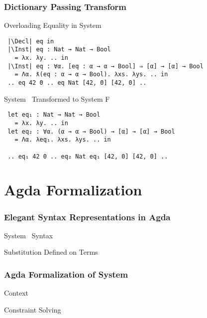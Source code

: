 \documentclass{beamer}
\begin{document}
\begin{frame}[fragile]
  \frametitle{Dictionary Passing Transform}
  \begin{block}{Overloading Equality in System \Fo\ }
    \begin{center}
      \begin{verbatim}
 |\Decl| eq in
 |\Inst| eq : Nat → Nat → Bool 
   = λx. λy. .. in
 |\Inst| eq : ∀α. [eq : α → α → Bool] ⇒ [α] → [α] → Bool 
   = Λα. ƛ(eq : α → α → Bool). λxs. λys. .. in
 .. eq 42 0 .. eq Nat [42, 0] [42, 0] .. 
      \end{verbatim}
    \end{center}
  \end{block}
  \begin{block}{System \Fo\ Transformed to System F}
    \begin{center}
      \begin{verbatim}
 let eq₁ : Nat → Nat → Bool 
   = λx. λy. .. in
 let eq₂ : ∀α. (α → α → Bool) → [α] → [α] → Bool 
   = Λα. λeq₁. λxs. λys. .. in
  
 .. eq₁ 42 0 .. eq₂ Nat eq₁ [42, 0] [42, 0] .. 
      \end{verbatim}
    \end{center}
  \end{block}
\end{frame}

\section{Agda Formalization}

\begin{frame}[fragile]
  \frametitle{Elegant Syntax Representations in Agda}
  \begin{block}{System \Fo\ Syntax}
    \begin{small}
      \FoTerm
    \end{small}
  \end{block}
  \begin{block}{Substitution Defined on Terms}
    \begin{small}
      \Fsubs
    \end{small}
  \end{block}
\end{frame}

\begin{frame}[fragile]
  \frametitle{Agda Formalization of System \Fo}
  \begin{block}{Context}
    \FoCtx
  \end{block}
  \begin{block}{Constraint Solving}
    \FoCstrSolve
  \end{block}
\end{frame}
\end{document}
